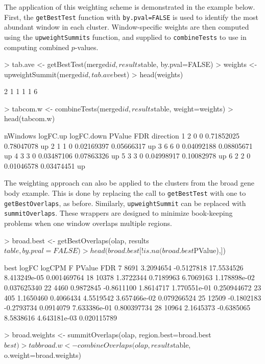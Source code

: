 \documentclass[12pt]{report}
\renewenvironment{Schunk}{\vspace{0pt}}{\vspace{0pt}}
\newcommand{\code}[1]{{\small\texttt{#1}}}
\begin{document}
The application of this weighting scheme is demonstrated in the example below.
First, the \code{getBestTest} function with \code{by.pval=FALSE} is used to identify the most abundant window in each cluster.
Window-specific weights are then computed using the \code{upweightSummits} function, and supplied to \code{combineTests} to use in computing combined $p$-values.

\begin{Schunk}
\begin{Sinput}
> tab.ave <- getBestTest(merged$id, results$table, by.pval=FALSE)
> weights <- upweightSummit(merged$id, tab.ave$best)
> head(weights)
\end{Sinput}
\begin{Soutput}
[1] 2 1 1 1 1 6
\end{Soutput}
\begin{Sinput}
> tabcom.w <- combineTests(merged$id, results$table, weight=weights)
> head(tabcom.w)
\end{Sinput}
\begin{Soutput}
  nWindows logFC.up logFC.down     PValue        FDR direction
1        2        0          0 0.71852025 0.78047078        up
2        1        1          0 0.02169397 0.05666317        up
3        6        6          0 0.04092188 0.08805671        up
4        3        3          0 0.03487106 0.07863326        up
5        3        3          0 0.04998917 0.10082978        up
6        2        2          0 0.01046578 0.03474451        up
\end{Soutput}
\end{Schunk}

The weighting approach can also be applied to the clusters from the broad gene body example.
This is done by replacing the call to \code{getBestTest} with one to \code{getBestOverlaps}, as before.
Similarly, \code{upweightSummit} can be replaced with \code{summitOverlaps}.
These wrappers are designed to minimize book-keeping problems when one window overlaps multiple regions.

\begin{Schunk}
\begin{Sinput}
> broad.best <- getBestOverlaps(olap, results$table, by.pval=FALSE)
> head(broad.best[!is.na(broad.best$PValue),])
\end{Sinput}
\begin{Soutput}
    best      logFC     logCPM          F       PValue         FDR
7   8691  3.2094654 -0.5127818 17.5534526 8.413249e-05 0.001469764
18 10378  1.3722344  0.7189963  6.7069163 1.178898e-02 0.037625340
22  4460  0.9872845 -0.8611100  1.8614717 1.770551e-01 0.250944672
23   405  1.1650460  0.4066434  4.5519542 3.657466e-02 0.079266524
25 12509 -0.1802183 -0.2793734  0.0914079 7.633386e-01 0.800397734
28 10964  2.1645373 -0.6385065  8.5838616 4.643181e-03 0.020115789
\end{Soutput}
\begin{Sinput}
> broad.weights <- summitOverlaps(olap, region.best=broad.best$best)
> tabbroad.w <- combineOverlaps(olap, results$table, o.weight=broad.weights) 
\end{Sinput}
\end{Schunk}
\end{document}
